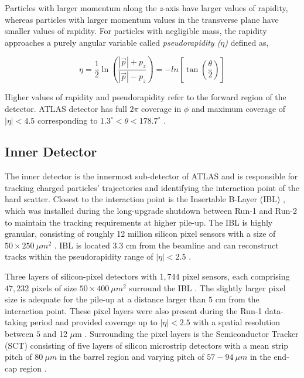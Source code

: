 Particles with larger momentum along the \textit{z}-axis have larger values of rapidity, whereas particles with larger momentum values in the transverse plane have smaller values of rapidity. For particles with negligible mass, the rapidity approaches a purely angular variable called \textit{pseudorapidity ($\eta$)} defined as, 

\begin{equation}
    \eta = \frac{1}{2}\ln{ \left( \frac{ |\vec{p}|+p_{z}}{ |\vec{p}| -p_{z}} \right) } = -ln { \left[ \tan \left( \frac{\theta}{2}\right) \right] } 
    \label{eqn:PseudoRapidity}
\end{equation}

Higher values of rapidity and pseudorapidity refer to the forward region of the detector. ATLAS detector has full $2\pi$ coverage in $\phi$ and maximum coverage of $|\eta| < 4.5$ corresponding to $1.3^{\circ} < \theta < 178.7^{\circ} $ \cite{ATLAS}. 

\subsection{Inner Detector}
\label{subsec:ID}
The inner detector is the innermost sub-detector of ATLAS and is responsible for tracking charged particles' trajectories and identifying the interaction point of the hard scatter. Closest to the interaction point is the Insertable B-Layer (IBL) \cite{ATLAS_IBL}, which was installed during the long-upgrade shutdown between Run-1 and Run-2 to maintain the tracking requirements at higher pile-up. The IBL is highly granular, consisting of roughly 12 million silicon pixel sensors with a size of $50\times 250 ~\mu m^2$ \cite{ATLAS_IBL}. IBL is located $3.3$ cm from the beamline and can reconstruct tracks within the pseudorapidity range of $|\eta|<2.5$ \cite{ATLAS_IBL}. 

Three layers of silicon-pixel detectors with $1,744$ pixel sensors, each comprising $47,232$ pixels of size $50\times 400 ~\mu m^2$ surround the IBL \cite{ID_Pixel}. The slightly larger pixel size is adequate for the pile-up at a distance larger than $5$ cm from the interaction point. These pixel layers were also present during the Run-1 data-taking period and provided coverage up to $|\eta|<2.5$ with a spatial resolution between $5$ and 12 $\mu$m \cite{ID_Pixel}. Surrounding the pixel layers is the Semiconductor Tracker (SCT) consisting of five layers of silicon microstrip detectors with a mean strip pitch of $80 ~\mu m$ in the barrel region and varying pitch of  $57-94 ~\mu m$ in the end-cap region \cite{ID_Strips}. 

